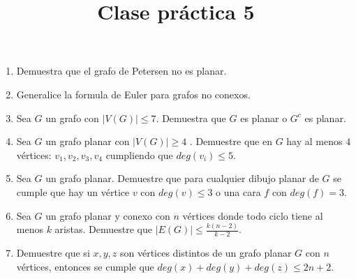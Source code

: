 \documentclass{article}
\begin{document}
\title{Clase pr\'actica 5}
\maketitle

\begin{enumerate}
    \item Demuestra que el grafo de Petersen no es planar.
    \item Generalice la formula de Euler para grafos no conexos.
    \item Sea $G$ un grafo con $|V(G)| \leq 7$. Demuestra que $G$ es planar o $G^c$ es planar.
    \item Sea $G$ un grafo planar con $|V(G)| \geq 4$ . Demuestre que en $G$ hay al menos $4$ v\'ertices: $v_1, v_2, v_3, v_4$ cumpliendo que $deg(v_i) \leq 5$.
    \item Sea $G$ un grafo planar. Demuestre que para cualquier dibujo planar de $G$ se cumple que hay un v\'ertice $v$ con $deg(v) \leq 3$ o una cara $f$ con $deg(f) = 3$.
    \item Sea $G$ un grafo planar y conexo con $n$ v\'ertices donde todo ciclo tiene al menos $k$ aristas. Demuestre que $|E(G)| \leq \frac{k(n-2)}{k-2}$.
    \item Demuestre que si $x, y, z$ son v\'ertices distintos de un grafo planar $G$ con $n$ v\'ertices, entonces se cumple que $deg(x) + deg(y) + deg(z) \leq 2n + 2$.
 \end{enumerate}
\end{document}
